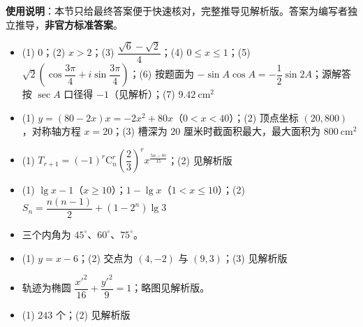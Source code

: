 
\begin{gknotice}
\textbf{使用说明}：本节只给最终答案便于快速核对，完整推导见解析版。答案为编写者独立推导，\textbf{非官方标准答案}。
\end{gknotice}

\begin{itemize}[leftmargin=2.6em]
  \item[\textbf{1.}] (1) $0$；(2) $x>2$；(3) $\dfrac{\sqrt6-\sqrt2}{4}$；(4) $0\leqslant x\leqslant1$；(5) $\sqrt2\left(\cos\dfrac{3\pi}{4}+i\sin\dfrac{3\pi}{4}\right)$；(6) 按题面为 $-\sin A\cos A=-\dfrac12\sin2A$；源解答按 $\sec A$ 口径得 $-1$（见解析）；(7) $9.42\ \mathrm{cm^2}$
  \item[\textbf{2.}] (1) $y=(80-2x)x=-2x^2+80x$（$0<x<40$）；(2) 顶点坐标 $(20,800)$，对称轴方程 $x=20$；(3) 槽深为 $20$ 厘米时截面积最大，最大面积为 $800\ \mathrm{cm^2}$
  \item[\textbf{3.}] (1) $T_{r+1}=(-1)^r\mathrm{C}_n^r\left(\dfrac23\right)^r x^{\frac{5n-8r}{15}}$；(2) 见解析版
  \item[\textbf{4.}] (1) $\lg x-1$（$x\geqslant10$）；$1-\lg x$（$1<x\leqslant10$）；(2) $S_n=\dfrac{n(n-1)}{2}+(1-2^n)\lg3$
  \item[\textbf{5.}] 三个内角为 $45^\circ$、$60^\circ$、$75^\circ$。
  \item[\textbf{6.}] (1) $y=x-6$；(2) 交点为 $(4,-2)$ 与 $(9,3)$；(3) 见解析版
  \item[\textbf{7.}] 轨迹为椭圆 $\dfrac{x'^2}{16}+\dfrac{y'^2}{9}=1$；略图见解析版。
  \item[\textbf{8.}] (1) $243$ 个；(2) 见解析版
\end{itemize}
